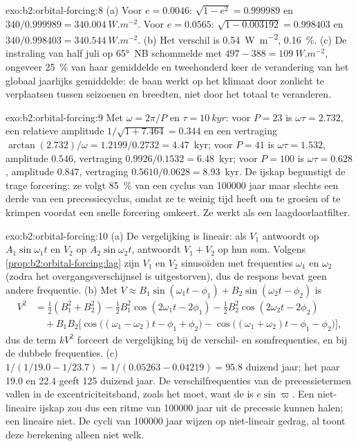\begin{solution}{exo:b2:orbital-forcing:8}
(a) Voor $e = 0.0046$: $\sqrt{1 - e^2} = 0.999989$ en $340/0.999989 = \qty{340.004}{W.m^{-2}}$. Voor
$e = 0.0565$: $\sqrt{1 - 0.003192} = 0.998403$ en $340/0.998403 = \qty{340.544}{W.m^{-2}}$. (b) Het
verschil is \qty{0.54}{W.m^{-2}}, \qty{0.16}{\percent}. (c) De instraling van half juli op \ang{65}~NB
schommelde met $497 - 388 = \qty{109}{W.m^{-2}}$, ongeveer \qty{25}{\percent} van haar gemiddelde en tweehonderd
keer de verandering van het globaal jaarlijks gemiddelde: de baan werkt op het klimaat door zonlicht te verplaatsen tussen
seizoenen en breedten, niet door het totaal te veranderen.
\end{solution}

\begin{solution}{exo:b2:orbital-forcing:9}
Met $\omega = 2\pi/P$ en $\tau = \qty{10}{kyr}$: voor $P = 23$ is $\omega\tau = 2.732$, een relatieve
amplitude $1/\sqrt{1 + 7.464} = 0.344$ en een vertraging $\arctan(2.732)/\omega = 1.2199/0.2732 = 4.47$~kyr;
voor $P = 41$ is $\omega\tau = 1.532$, amplitude $0.546$, vertraging $0.9926/0.1532 = 6.48$~kyr; voor $P =
100$ is $\omega\tau = 0.628$, amplitude $0.847$, vertraging $0.5610/0.0628 = 8.93$~kyr. De ijskap
begunstigt de trage forcering: ze volgt \qty{85}{\percent} van een cyclus van \num{100000} jaar maar slechts een
derde van een precessiecyclus, omdat ze te weinig tijd heeft om te groeien of te krimpen voordat een snelle forcering
omkeert. Ze werkt als een laagdoorlaatfilter.
\end{solution}

\begin{solution}{exo:b2:orbital-forcing:10}
(a) De vergelijking is lineair: als $V_1$ antwoordt op $A_1\sin\omega_1t$ en $V_2$ op
$A_2\sin\omega_2t$, antwoordt $V_1 + V_2$ op hun som. Volgens \cref{prop:b2:orbital-forcing:lag} zijn $V_1$ en
$V_2$ sinusoïden met frequenties $\omega_1$ en $\omega_2$ (zodra het overgangsverschijnsel is uitgestorven), dus
de respons bevat geen andere frequentie. (b) Met $V \approx B_1\sin(\omega_1t - \phi_1) +
B_2\sin(\omega_2t - \phi_2)$ is
\[
\begin{aligned}
  V^2 &= \tfrac12(B_1^2 + B_2^2) - \tfrac12B_1^2\cos(2\omega_1t - 2\phi_1) -
  \tfrac12B_2^2\cos(2\omega_2t - 2\phi_2)\\
  &\quad + B_1B_2\bigl[\cos\bigl((\omega_1 - \omega_2)t - \phi_1 + \phi_2\bigr) -
  \cos\bigl((\omega_1 + \omega_2)t - \phi_1 - \phi_2\bigr)\bigr],
\end{aligned}
\]
dus de term $kV^2$ forceert de vergelijking bij de verschil- en somfrequenties, en bij de dubbele
frequenties. (c) $1/(1/19.0 - 1/23.7) = 1/(0.05263 - 0.04219) = 95.8$ duizend jaar; het paar 19.0
en 22.4 geeft 125 duizend jaar. De verschilfrequenties van de precessietermen vallen in de
excentriciteitsband, zoals het moet, want de  is $e\sin\varpi$. Een niet-lineaire
ijskap zou dus een ritme van \num{100000} jaar uit de precessie kunnen halen; een lineaire
niet. De cycli van \num{100000} jaar wijzen op niet-lineair gedrag, al toont deze berekening
alleen niet welk.
\end{solution}

